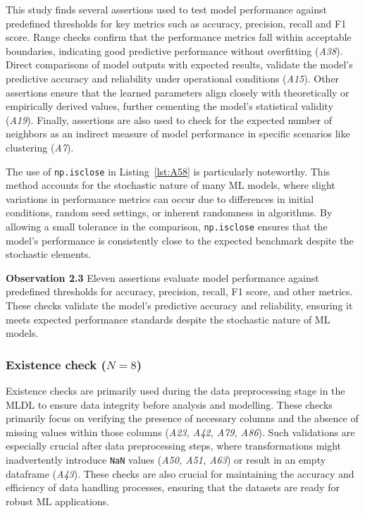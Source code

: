 \documentclass[smallextended]{svjour3}       %
\newcommand{\highlight}[1]{\begin{framed}%
  \noindent#1
\end{framed}}
\begin{document}
This study finds several assertions used to test model performance against predefined thresholds for key metrics such as accuracy, precision, recall and F1 score. Range checks confirm that the performance metrics fall within acceptable boundaries, indicating good predictive performance without overfitting (\emph{A38}). Direct comparisons of model outputs with expected results, validate the model's predictive accuracy and reliability under operational conditions (\emph{A15}). Other assertions ensure that the learned parameters align closely with theoretically or empirically derived values, further cementing the model’s statistical validity (\emph{A19}). Finally, assertions are also used to check for the expected number of neighbors as an indirect measure of model performance in specific scenarios like clustering (\emph{A7}).

The use of \lstinline{np.isclose} in Listing~\ref{lst:A58} is particularly noteworthy. This method accounts for the stochastic nature of many ML models, where slight variations in performance metrics can occur due to differences in initial conditions, random seed settings, or inherent randomness in algorithms. By allowing a small tolerance in the comparison, \lstinline{np.isclose} ensures that the model's performance is consistently close to the expected benchmark despite the stochastic elements.

\highlight{\textbf{Observation 2.3} Eleven assertions evaluate model performance against predefined thresholds for accuracy, precision, recall, F1 score, and other metrics. These checks validate the model's predictive accuracy and reliability, ensuring it meets expected performance standards despite the stochastic nature of ML models.}

\subsubsection{Existence check ($N = 8$)}

Existence checks are primarily used during the data preprocessing stage in the MLDL to ensure data integrity before analysis and modelling. These checks primarily focus on verifying the presence of necessary columns and the absence of missing values within those columns (\emph{A23, A42, A79, A86}). Such validations are especially crucial after data preprocessing steps, where transformations might inadvertently introduce \lstinline{NaN} values (\emph{A50, A51, A63}) or result in an empty dataframe (\emph{A43}). These checks are also crucial for maintaining the accuracy and efficiency of data handling processes, ensuring that the datasets are ready for robust ML applications.
\end{document}
